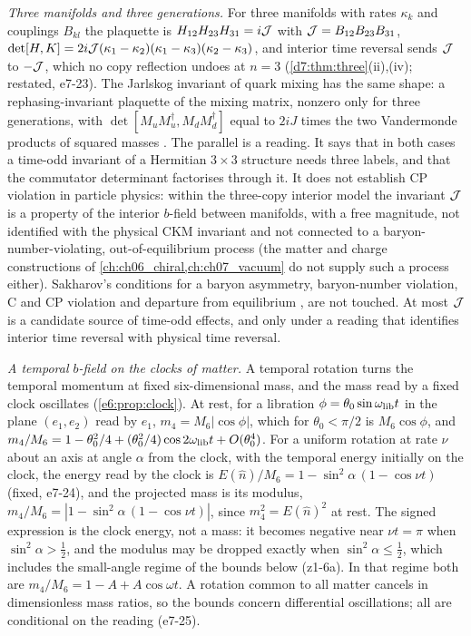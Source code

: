 \emph{Three manifolds and three generations.} For three manifolds with rates $\kappa_k$ and couplings $B_{kl}$ the plaquette is
$H_{12}H_{23}H_{31}=i\mathcal J$ with $\mathcal J=B_{12}B_{23}B_{31}$, $\det[H,K]=2i\mathcal J(\kappa_1-\kappa_2)(\kappa_1-\kappa_3)(\kappa_2-\kappa_3)$, and interior time
reversal sends $\mathcal J$ to $-\mathcal J$, which no copy reflection undoes at $n=3$ (\cref{d7:thm:three}(ii),(iv); restated, e7-23). The Jarlskog invariant of
quark mixing has the same shape: a rephasing-invariant plaquette of the mixing matrix, nonzero only for three generations, with
$\det[M_uM_u^\dagger,M_dM_d^\dagger]$ equal to $2iJ$ times the two Vandermonde products of squared masses \cite{Jarlskog85,KobayashiMaskawa73}. The
parallel is a reading. It says that in both cases a time-odd invariant of a Hermitian $3\times3$ structure needs three labels, and that the
commutator determinant factorises through it. It does not establish CP violation in particle physics: within the three-copy interior model
the invariant $\mathcal J$ is a property of the interior $b$-field between manifolds, with a free magnitude, not identified with the physical CKM
invariant and not connected to a baryon-number-violating, out-of-equilibrium process (the matter and charge constructions of
\cref{ch:ch06_chiral,ch:ch07_vacuum} do not supply such a process either). Sakharov's conditions for a baryon asymmetry,
baryon-number violation, C and CP violation and departure from equilibrium \cite{Sakharov67}, are not touched. At most $\mathcal J$ is a candidate source
of time-odd effects, and only under a reading that identifies interior time reversal with physical time reversal.

\emph{A temporal $b$-field on the clocks of matter.} A temporal rotation turns the temporal momentum at fixed six-dimensional mass, and the mass
read by a fixed clock oscillates (\cref{e6:prop:clock}). At rest, for a libration $\phi=\theta_0\sin\omega_{\rm lib} t$ in the plane $(e_1,e_2)$ read by
$e_1$, $m_4=M_6|\cos\phi|$, which for $\theta_0<\pi/2$ is $M_6\cos\phi$, and $m_4/M_6=1-\theta_0^2/4+(\theta_0^2/4)\cos2\omega_{\rm lib} t+O(\theta_0^4)$. For a uniform
rotation at rate $\nu$ about an axis at angle $\alpha$ from the clock, with the temporal energy initially on the clock, the energy read by the clock is
$E(\hat n)/M_6=1-\sin^2\alpha\,(1-\cos\nu t)$ (fixed, e7-24), and the projected mass is its modulus, $m_4/M_6=|1-\sin^2\alpha\,(1-\cos\nu t)|$, since
$m_4^2=E(\hat n)^2$ at rest. The signed expression is the clock energy, not a mass: it becomes negative near $\nu t=\pi$ when $\sin^2\alpha>\tfrac12$, and the
modulus may be dropped exactly when $\sin^2\alpha\le\tfrac12$, which includes the small-angle regime of the bounds below (z1-6a). In that
regime both are $m_4/M_6=1-A+A\cos\omega t$. A rotation common to all matter cancels in dimensionless mass ratios, so the bounds concern differential
oscillations; all are conditional on the reading (e7-25).

